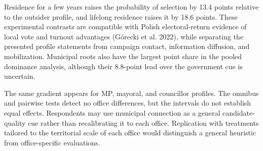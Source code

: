 \documentclass[
  letterpaper,
  DIV=11,
  numbers=noendperiod]{scrartcl}
\newcommand{\criticmarkupadd}[1]{#1}
\newcommand{\criticmarkuprm}[1]{}
\begin{document}
\criticmarkuprm{The 13--19-point}\criticmarkupadd{Residence for a few
years raises the probability of selection by 13.4 points relative to the
outsider profile, and lifelong residence raises it by 18.6 points. These
experimental} contrasts \criticmarkuprm{show that respondents
distinguish lifelong residents, newer residents, and outsiders even when
national political position and other candidate traits }are
\criticmarkuprm{visible. The same gradient appears for MP, mayoral, and
councillor profiles, so the local advantage is not confined to
specifically local offices. Related studies find local-root advantages
for party leaders (Put 2021), Senate candidates (Hunt 2022), and state
legislators (Hunt and Rouse 2023), while local-election research
emphasizes that their magnitude varies across candidates and settings
(Czapiewski and Woźniak 2021; Zissel 2026).
The}\criticmarkupadd{compatible with} Polish electoral-return
\criticmarkuprm{literature documents}\criticmarkupadd{evidence of} local
vote and turnout advantages (Górecki et al. 2022), \criticmarkuprm{which
can also reflect}\criticmarkupadd{while separating the presented profile
statements from} campaign contact, information diffusion, and
\criticmarkuprm{mobilization.}\criticmarkupadd{mobilization. Municipal
roots also have the largest point share in the pooled dominance
analysis, although their 8.8-point lead over the government cue is
uncertain.}

\criticmarkuprm{One explanation}\criticmarkupadd{The same gradient
appears} for \criticmarkupadd{MP, mayoral, and councillor profiles. The
omnibus and pairwise tests detect no office differences, but }the
\criticmarkuprm{office pattern is that
respondents}\criticmarkupadd{intervals do not establish equal effects.
Respondents may} use municipal connection as a general candidate-quality
cue rather than recalibrating it to \criticmarkuprm{the functional
demands of }each office. \criticmarkuprm{The identical attribute wording
and fit-for-office task may have encouraged that cross-office
interpretation. The null interaction does not imply complete
nationalization: the municipal statements produced positive contrasts in
every office, and the uncertainty is too wide to establish equal
effects. }Replication with treatments tailored to \criticmarkuprm{each
office's}\criticmarkupadd{the} territorial scale \criticmarkupadd{of
each office }would distinguish a general heuristic from office-specific
evaluations.
\end{document}
